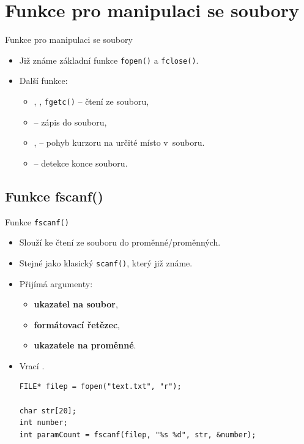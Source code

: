\documentclass[14pt,aspectratio=169]{beamer}
\begin{document}
    \section{Funkce pro manipulaci se soubory}
    \begin{frame}[t]{Funkce pro manipulaci se soubory}
        \begin{itemize}
            \item Již známe základní funkce \texttt{fopen()} a \texttt{fclose()}.
            \item Další funkce:
            \begin{itemize}
                \item \texttt{}, \texttt{}, \texttt{fgetc()} -- čtení ze souboru,
                \item \texttt{} -- zápis do souboru,
                \item \texttt{}, \texttt{} -- pohyb kurzoru na určité místo v~souboru.
                \item \texttt{} -- detekce konce souboru.
            \end{itemize}
        \end{itemize}
    \end{frame}

    \subsection{Funkce fscanf()}
    \begin{frame}[t,fragile]{Funkce \texttt{fscanf()}}
        \begin{itemize}
            \item Slouží ke čtení ze souboru do proměnné/proměnných.
            \item Stejné jako klasický \texttt{scanf()}, který již známe. 
            \item Přijímá argumenty:
            \begin{itemize}
                \item \textbf{ukazatel na soubor},
                \item \textbf{formátovací řetězec},
                \item \textbf{ukazatele na proměnné}.
            \end{itemize}
            \item Vrací .
            \begin{lstlisting}
FILE* filep = fopen("text.txt", "r");

char str[20];
int number;
int paramCount = fscanf(filep, "%s %d", str, &number);
            \end{lstlisting}
        \end{itemize}
    \end{frame}
\end{document}
